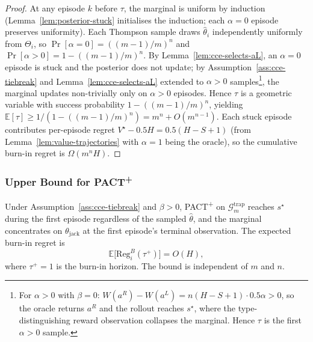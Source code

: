 \begin{proof}
At any episode $k$ before $\tau$, the marginal is uniform by induction (Lemma~\ref{lem:posterior-stuck} initialises the induction; each $\alpha = 0$ episode preserves uniformity). Each Thompson sample draws $\hat\theta_i$ independently uniformly from $\Theta_i$, so $\Pr[\alpha = 0] = ((m-1)/m)^n$ and $\Pr[\alpha > 0] = 1 - ((m-1)/m)^n$. By Lemma~\ref{lem:cce-selects-aL}, an $\alpha = 0$ episode is stuck and the posterior does not update; by Assumption~\ref{ass:cce-tiebreak} and Lemma~\ref{lem:cce-selects-aL} extended to $\alpha > 0$ samples\footnote{For $\alpha > 0$ with $\beta = 0$: $W(a^R) - W(a^L) = n(H - S + 1) \cdot 0.5\alpha > 0$, so the oracle returns $a^R$ and the rollout reaches $s^\star$, where the type-distinguishing reward observation collapses the marginal. Hence $\tau$ is the first $\alpha > 0$ sample.}, the marginal updates non-trivially only on $\alpha > 0$ episodes. Hence $\tau$ is a geometric variable with success probability $1 - ((m-1)/m)^n$, yielding $\mathbb{E}[\tau] \geq 1/(1 - ((m-1)/m)^n) = m^n + O(m^{n-1})$. Each stuck episode contributes per-episode regret $V^\star - 0.5 H = 0.5(H - S + 1)$ (from Lemma~\ref{lem:value-trajectories} with $\alpha = 1$ being the oracle), so the cumulative burn-in regret is $\Omega(m^n H)$.
\end{proof}

\subsubsection{Upper Bound for PACT\textsuperscript{+}}
\label{app:pact-plus-upper}

\begin{proposition}
\label{prop:pact-plus-burnin}
Under Assumption~\ref{ass:cce-tiebreak} and $\beta > 0$, PACT\textsuperscript{+} on $\mathcal{G}_m^{\mathrm{trap}}$ reaches $s^\star$ during the first episode regardless of the sampled $\hat\theta$, and the marginal concentrates on $\theta_{\mathrm{jack}}$ at the first episode's terminal observation. The expected burn-in regret is
\begin{equation}
\mathbb{E}\big[\mathrm{Reg}_i^B(\tau^+)\big] = O(H),
\end{equation}
where $\tau^+ = 1$ is the burn-in horizon. The bound is independent of $m$ and $n$.
\end{proposition}

